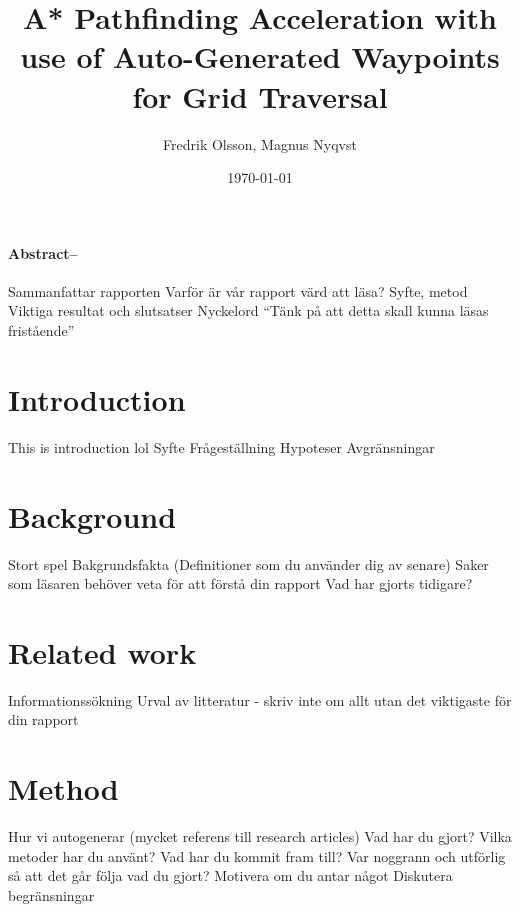 \documentclass[a4paper]{article}
\title{\Huge A* Pathfinding Acceleration with use of Auto-Generated Waypoints for Grid Traversal}
\author{Fredrik Olsson, Magnus Nyqvst}
\date{\today}
\begin{document}
\maketitle
\newpage
\thispagestyle{empty}
\paragraph{Abstract--}
Sammanfattar rapporten
Varför är vår rapport värd att läsa?
Syfte, metod
Viktiga resultat och slutsatser Nyckelord
“Tänk på att detta skall kunna läsas fristående”

\tableofcontents
\listoffigures
\newpage
{}
\twocolumn
\section{Introduction}
This is introduction lol \newline
Syfte \newline
Frågeställning \newline
Hypoteser \newline
Avgränsningar

\section{Background}
Stort spel \newline
Bakgrundsfakta (Definitioner som du använder dig av senare) \newline
Saker som läsaren behöver veta för att förstå din rapport \newline
Vad har gjorts tidigare?

\section{Related work}
Informationssökning \newline
Urval av litteratur - skriv inte om allt utan det viktigaste för din rapport

\section{Method}
Hur vi autogenerar (mycket referens till research articles) \newline
Vad har du gjort? \newline
Vilka metoder har du använt? \newline
Vad har du kommit fram till? \newline
Var noggrann och utförlig så att det går följa vad du gjort? \newline
Motivera om du antar något \newline
Diskutera begränsningar
\end{document}
